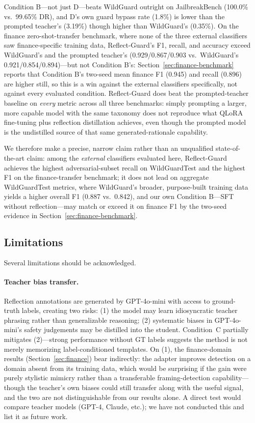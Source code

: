 \documentclass[superintelligence,article,submit,pdftex,moreauthors]{Definitions/mdpi}
\begin{document}
Condition B---not just D---beats WildGuard outright on JailbreakBench (100.0\% vs.\ 99.65\% DR), and D's own guard bypass rate (1.8\%) is lower than the prompted teacher's (3.19\%) though higher than WildGuard's (0.35\%). On the finance zero-shot-transfer benchmark, where none of the three external classifiers saw finance-specific training data, Reflect-Guard's F1, recall, and accuracy exceed WildGuard's and the prompted teacher's (0.929/0.867/0.903 vs.\ WildGuard's 0.921/0.854/0.894)---but not Condition B's: Section~\ref{sec:finance-benchmark} reports that Condition B's two-seed mean finance F1 (0.945) and recall (0.896) are higher still, so this is a win against the external classifiers specifically, not against every evaluated condition. Reflect-Guard does beat the prompted-teacher baseline on \emph{every} metric across all three benchmarks: simply prompting a larger, more capable model with the same taxonomy does not reproduce what QLoRA fine-tuning plus reflection distillation achieves, even though the prompted model is the undistilled source of that same generated-rationale capability.

We therefore make a precise, narrow claim rather than an unqualified state-of-the-art claim: among the \emph{external} classifiers evaluated here, Reflect-Guard achieves the highest adversarial-subset recall on WildGuardTest and the highest F1 on the finance-transfer benchmark; it does not lead on aggregate WildGuardTest metrics, where WildGuard's broader, purpose-built training data yields a higher overall F1 (0.887 vs.\ 0.842), and our own Condition B---SFT without reflection---may match or exceed it on finance F1 by the two-seed evidence in Section~\ref{sec:finance-benchmark}.

\subsection{Limitations}
\label{sec:limitations}

Several limitations should be acknowledged.

\paragraph{Teacher bias transfer.}
Reflection annotations are generated by GPT-4o-mini with access to ground-truth labels, creating two risks: (1) the model may learn idiosyncratic teacher phrasing rather than generalizable reasoning; (2) systematic biases in GPT-4o-mini's safety judgements may be distilled into the student. Condition~C partially mitigates (2)---strong performance without GT labels suggests the method is not merely memorizing label-conditioned templates. On (1), the finance-domain results (Section~\ref{sec:finance}) bear indirectly: the adapter improves detection on a domain absent from its training data, which would be surprising if the gain were purely stylistic mimicry rather than a transferable framing-detection capability---though the teacher's own biases could still transfer along with the useful signal, and the two are not distinguishable from our results alone. A direct test would compare teacher models (GPT-4, Claude, etc.); we have not conducted this and list it as future work.
\end{document}

